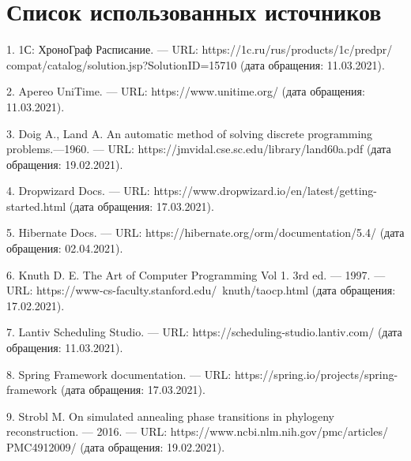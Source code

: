 \clearpage                                  %
\chapter*{Список использованных источников}	
\label{references}

1. 1С: ХроноГраф Расписание. — URL: https://1c.ru/rus/products/1c/predpr/ compat/catalog/solution.jsp?SolutionID=15710 (дата обращения: 11.03.2021).

2. Apereo UniTime. — URL: https://www.unitime.org/ (дата обращения: 11.03.2021).

3.  Doig A., Land A. An automatic method of solving discrete programming problems.—1960.
— URL: https://jmvidal.cse.sc.edu/library/land60a.pdf (дата обращения: 19.02.2021).

4. Dropwizard Docs. — URL: https://www.dropwizard.io/en/latest/getting- started.html (дата обращения: 17.03.2021).

5. Hibernate Docs. — URL: https://hibernate.org/orm/documentation/5.4/ (дата обращения: 02.04.2021).

6. Knuth D. E. The Art of Computer Programming Vol 1. 3rd ed. — 1997. — URL: https://www-cs-faculty.stanford.edu/~knuth/taocp.html (дата обращения: 17.02.2021).

7. Lantiv Scheduling Studio. — URL: https://scheduling-studio.lantiv.com/ (дата обращения: 11.03.2021).

8. Spring Framework documentation. — URL: https://spring.io/projects/spring- framework (дата обращения: 17.03.2021).

9. Strobl M. On simulated annealing phase transitions in phylogeny reconstruction. — 2016. — URL: https://www.ncbi.nlm.nih.gov/pmc/articles/ PMC4912009/ (дата обращения: 19.02.2021).

